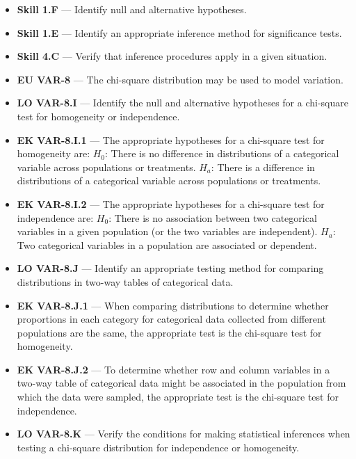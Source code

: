 \documentclass[11pt]{article}
\begin{document}


{\small
\begin{itemize}[leftmargin=1.5em,itemsep=2pt,topsep=2pt]
  \item \textbf{Skill 1.F} --- Identify null and alternative hypotheses.
  \item \textbf{Skill 1.E} --- Identify an appropriate inference method for significance tests.
  \item \textbf{Skill 4.C} --- Verify that inference procedures apply in a given situation.
  \item \textbf{EU VAR-8} --- The chi-square distribution may be used to model variation.
  \item \textbf{LO VAR-8.I} --- Identify the null and alternative hypotheses for a chi-square test for homogeneity or independence.
  \item \textbf{EK VAR-8.I.1} --- The appropriate hypotheses for a chi-square test for homogeneity are: $H_0$: There is no difference in distributions of a categorical variable across populations or treatments. $H_a$: There is a difference in distributions of a categorical variable across populations or treatments.
  \item \textbf{EK VAR-8.I.2} --- The appropriate hypotheses for a chi-square test for independence are: $H_0$: There is no association between two categorical variables in a given population (or the two variables are independent). $H_a$: Two categorical variables in a population are associated or dependent.
  \item \textbf{LO VAR-8.J} --- Identify an appropriate testing method for comparing distributions in two-way tables of categorical data.
  \item \textbf{EK VAR-8.J.1} --- When comparing distributions to determine whether proportions in each category for categorical data collected from different populations are the same, the appropriate test is the chi-square test for homogeneity.
  \item \textbf{EK VAR-8.J.2} --- To determine whether row and column variables in a two-way table of categorical data might be associated in the population from which the data were sampled, the appropriate test is the chi-square test for independence.
  \item \textbf{LO VAR-8.K} --- Verify the conditions for making statistical inferences when testing a chi-square distribution for independence or homogeneity.

\end{itemize}}
\end{document}
